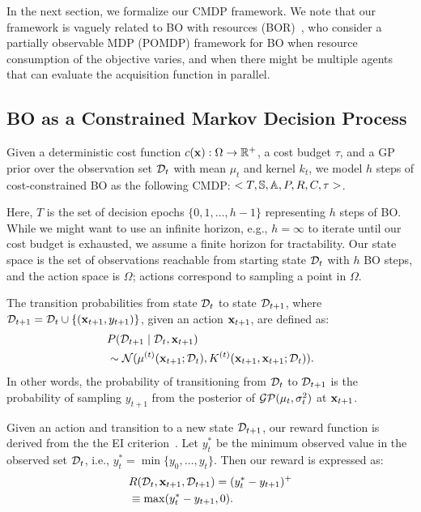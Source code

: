 In the next section, we formalize our CMDP framework.
We note that our framework is vaguely related to BO with resources (BOR)~\citep{dolatnia2016bayesian}, who consider a partially observable MDP (POMDP) framework for BO when resource consumption of the objective varies, and when there might be multiple agents that can evaluate the acquisition function in parallel. 

\subsection{BO as a Constrained Markov Decision Process}
Given a deterministic cost function $c({\mathbf{x}}): \Omega \rightarrow {\mathbb R}^+$, a cost budget $\tau$, and a GP prior over the observation set ${\mathcal{D}}_t$ with mean $\mu_t$ and kernel $k_t$, we model $h$ steps of cost-constrained BO as the following CMDP: $<T, {\mathbb S}, {\mathbb A}, P, R, C, \tau>$. 

Here, $T$ is the set of decision epochs $\{0, 1, \ldots, h-1\}$ representing $h$ steps of BO. 
While we might want to use an infinite horizon, e.g., $h = \infty$ to iterate until our cost budget is exhausted, we assume a finite horizon for tractability. 
Our state space is the set of observations reachable from starting state ${\mathcal{D}}_t$ with $h$ BO steps, and the action space is $\Omega$; actions correspond to sampling a point in $\Omega$. 

The transition probabilities from state ${\mathcal{D}}_t$ to state ${\mathcal{D}}_{t+1}$, where ${\mathcal{D}}_{t+1} = {\mathcal{D}}_t \cup \{({\mathbf{x}}_{t+1}, y_{t+1})\}$, given an action ${\mathbf{x}}_{t+1}$, are defined as:
\begin{align*}
    & P( {\mathcal{D}}_{t+1} \mid {\mathcal{D}}_t, {\mathbf{x}}_{t+1}) \\
    & \sim {\mathcal N}(\mu^{(t)}({\mathbf{x}}_{t+1} ; {\mathcal{D}}_t), K^{(t)}({\mathbf{x}}_{t+1}, {\mathbf{x}}_{t+1}; {\mathcal{D}}_t)). 
\end{align*}
In other words, the probability of transitioning from ${\mathcal{D}}_t$ to ${\mathcal{D}}_{t+1}$ is the probability of sampling $y_{t+1}$ from the posterior of $\operatorname{\mathcal{GP}}(\mu_t, \sigma_t^2)$ at ${\mathbf{x}}_{t+1}$.

Given an action and transition to a new state ${\mathcal{D}}_{t+1}$, our reward function is derived from the the EI criterion~\citep{jones1998ego}. 
Let $y_t^*$ be the minimum observed value in the observed set ${\mathcal{D}}_t$, i.e., $y_t^* = \min \{ y_0, \dots, y_t\}$. Then our reward is expressed as:
\begin{align*}
    & R({\mathcal{D}}_t, {\mathbf{x}}_{t+1}, {\mathcal{D}}_{t+1}) = ( y_t^* - y_{t+1})^+ \\
    & \equiv  \max (y_t^* - y_{t+1},0).
\end{align*}

